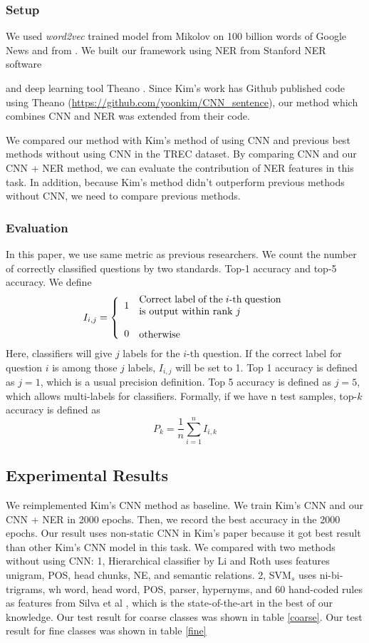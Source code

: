 \documentclass[10pt,twocolumn,letterpaper]{article}
\begin{document}
\subsubsection{Setup}
We used \textit{word2vec} trained model from Mikolov \cite{mikolov2013efficient} on 100 billion words of Google News and from \cite{mikolov2014word2vec}. We built our framework using NER from Stanford NER software \cite{finkel2005incorporating}

and deep learning tool Theano \cite{Bastien-Theano-2012}. Since Kim's work\cite{kim2014convolutional} has Github published code using Theano (\url{https://github.com/yoonkim/CNN_sentence}), our method which combines CNN and NER was extended from their code. 

We compared our method with Kim's method of using CNN and previous best methods without using CNN in the TREC dataset. By comparing CNN and our CNN + NER method, we can evaluate the contribution of NER features in this task. In addition, because Kim's method didn't outperform previous methods without CNN, we need to compare previous methods.

\subsubsection{Evaluation}
In this paper, we use same metric as previous researchers. We count the number of correctly classified questions by two standards. Top-1 accuracy and top-5 accuracy. We define
$$ 
I_{i,j} = 
\left\{ 
  \begin{array}{ll}
    1 & \parbox{5cm}{Correct label of the $i$-th question is output within rank $j$ }\\
    \\
    0 & \parbox{3cm}{otherwise}
  \end{array} 
\right. 
$$
Here, classifiers will give $j$ labels for the $i$-th question. If the correct label for question $i$ is among those $j$ labels, $I_{i,j}$ will be set to 1. Top 1 accuracy is defined as $j = 1$, which is a usual precision definition. Top 5 accuracy is defined as $j = 5$, which allows multi-labels for classifiers. Formally, if we have n test samples, top-$k $ accuracy is defined as
$$
P_k = \frac{1}{n}\sum_{i=1}^{n} I_{i,k} 
$$

\subsection{Experimental Results}
We reimplemented Kim's CNN method as baseline. We train Kim's CNN and our CNN + NER in 2000 epochs. Then, we record the best accuracy in the 2000 epochs. Our result uses non-static CNN in Kim's paper because it got best result than other Kim's CNN model in this task. We compared with two methods without using CNN: 1, Hierarchical classifier by Li and Roth\cite{li2002learning} uses features unigram, POS, head chunks, NE, and semantic relations. 2, SVM$_s$ uses ni-bi-trigrams, wh word, head word, POS, parser, hypernyms, and 60 hand-coded rules as features from Silva et al \cite{silva2011symbolic}, which is the state-of-the-art in the best of our knowledge. Our test result for coarse classes was shown in table \ref{coarse}. Our test result for fine classes was shown in table \ref{fine}
\end{document}
